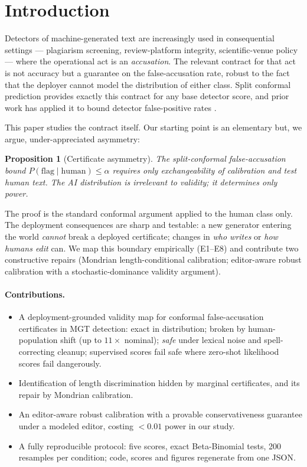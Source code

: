 \documentclass[11pt]{article}
\newtheorem{proposition}{Proposition}
\begin{document}
\section{Introduction}
Detectors of machine-generated text are increasingly used in consequential settings --- plagiarism screening, review-platform integrity, scientific-venue policy --- where the operational act is an \emph{accusation}. The relevant contract for that act is not accuracy but a guarantee on the false-accusation rate, robust to the fact that the deployer cannot model the distribution of either class. Split conformal prediction \cite{vovk,papadopoulos} provides exactly this contract for any base detector score, and prior work has applied it to bound detector false-positive rates \cite{mcp}.

This paper studies the contract itself. Our starting point is an elementary but, we argue, under-appreciated asymmetry:
\begin{proposition}[Certificate asymmetry]
The split-conformal false-accusation bound $P(\mathrm{flag}\mid\mathrm{human})\le\alpha$ requires only exchangeability of calibration and test \emph{human} text. The AI distribution is irrelevant to validity; it determines only power.
\end{proposition}
\noindent The proof is the standard conformal argument applied to the human class only. The deployment consequences are sharp and testable: a new generator entering the world \emph{cannot} break a deployed certificate; changes in \emph{who writes} or \emph{how humans edit} can. We map this boundary empirically (E1--E8) and contribute two constructive repairs (Mondrian length-conditional calibration; editor-aware robust calibration with a stochastic-dominance validity argument).
\paragraph{Contributions.}
\begin{itemize}
\item A deployment-grounded validity map for conformal false-accusation certificates in MGT detection: exact in distribution; broken by human-population shift (up to $11\times$ nominal); \emph{safe} under lexical noise and spell-correcting cleanup; supervised scores fail safe where zero-shot likelihood scores fail dangerously.
\item Identification of length discrimination hidden by marginal certificates, and its repair by Mondrian calibration.
\item An editor-aware robust calibration with a provable conservativeness guarantee under a modeled editor, costing $<0.01$ power in our study.
\item A fully reproducible protocol: five scores, exact Beta-Binomial tests, 200 resamples per condition; code, scores and figures regenerate from one JSON.
\end{itemize}
\end{document}
